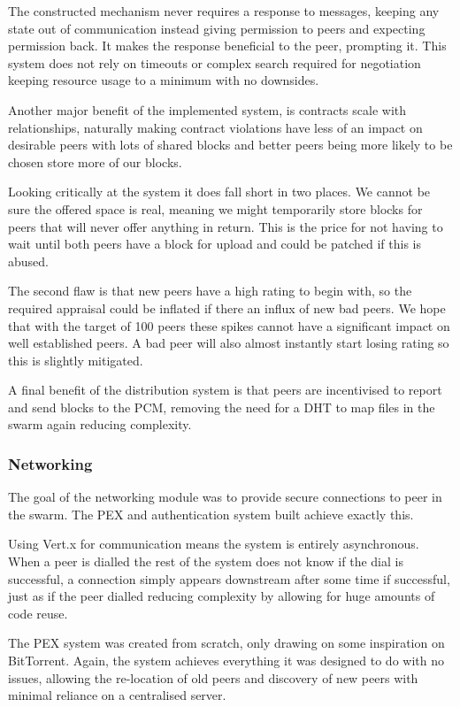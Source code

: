 \documentclass[11pt, a4paper, twoside]{report}
\begin{document}
The constructed mechanism never requires a response to messages, keeping any state out of communication instead giving permission to peers and expecting permission back. It makes the response beneficial to the peer, prompting it. This system does not rely on timeouts or complex search required for negotiation keeping resource usage to a minimum with no downsides.

Another major benefit of the implemented system, is contracts scale with relationships, naturally making contract violations have less of an impact on desirable peers with lots of shared blocks and better peers being more likely to be chosen store more of our blocks.

Looking critically at the system it does fall short in two places. We cannot be sure the  offered space is real, meaning we might temporarily store blocks for peers that will never offer anything in return. This is the price for not having to wait until both peers have a block for upload and could be patched if this is abused.

The second flaw is that new peers have a high rating to begin with, so the required appraisal could be inflated if there an influx of new bad peers. We hope that with the target of 100 peers these spikes cannot have a significant impact on well established peers. A bad peer will also almost instantly start losing rating so this is slightly mitigated.

A final benefit of the distribution system is that peers are incentivised to report and send blocks to the PCM, removing the need for a DHT to map files in the swarm again reducing complexity.

\subsubsection{Networking}

The goal of the networking module was to provide secure connections to peer in the swarm. The PEX and authentication system built achieve exactly this.

Using Vert.x for communication means the system is entirely asynchronous. When a peer is dialled the rest of the system does not know if the dial is successful, a connection simply appears downstream after some time if successful, just as if the peer dialled reducing complexity by allowing for huge amounts of code reuse.

The PEX system was created from scratch, only drawing on some inspiration on BitTorrent. Again, the system achieves everything it was designed to do with no issues, allowing the re-location of old peers and discovery of new peers with minimal reliance on a centralised server.
\end{document}

